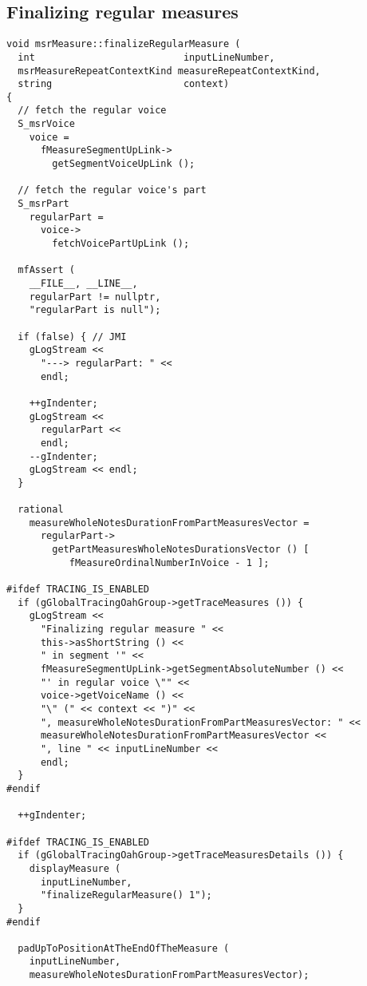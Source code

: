 \subsection{Finalizing regular measures}

\begin{lstlisting}[language=CPlusPlus]
void msrMeasure::finalizeRegularMeasure (
  int                          inputLineNumber,
  msrMeasureRepeatContextKind measureRepeatContextKind,
  string                       context)
{
  // fetch the regular voice
  S_msrVoice
    voice =
      fMeasureSegmentUpLink->
        getSegmentVoiceUpLink ();

  // fetch the regular voice's part
  S_msrPart
    regularPart =
      voice->
        fetchVoicePartUpLink ();

  mfAssert (
    __FILE__, __LINE__,
    regularPart != nullptr,
    "regularPart is null");

  if (false) { // JMI
    gLogStream <<
      "---> regularPart: " <<
      endl;

    ++gIndenter;
    gLogStream <<
      regularPart <<
      endl;
    --gIndenter;
    gLogStream << endl;
  }

  rational
    measureWholeNotesDurationFromPartMeasuresVector =
      regularPart->
        getPartMeasuresWholeNotesDurationsVector () [
           fMeasureOrdinalNumberInVoice - 1 ];

#ifdef TRACING_IS_ENABLED
  if (gGlobalTracingOahGroup->getTraceMeasures ()) {
    gLogStream <<
      "Finalizing regular measure " <<
      this->asShortString () <<
      " in segment '" <<
      fMeasureSegmentUpLink->getSegmentAbsoluteNumber () <<
      "' in regular voice \"" <<
      voice->getVoiceName () <<
      "\" (" << context << ")" <<
      ", measureWholeNotesDurationFromPartMeasuresVector: " <<
      measureWholeNotesDurationFromPartMeasuresVector <<
      ", line " << inputLineNumber <<
      endl;
  }
#endif

  ++gIndenter;

#ifdef TRACING_IS_ENABLED
  if (gGlobalTracingOahGroup->getTraceMeasuresDetails ()) {
    displayMeasure (
      inputLineNumber,
      "finalizeRegularMeasure() 1");
  }
#endif

  padUpToPositionAtTheEndOfTheMeasure (
    inputLineNumber,
    measureWholeNotesDurationFromPartMeasuresVector);


\end{lstlisting}
